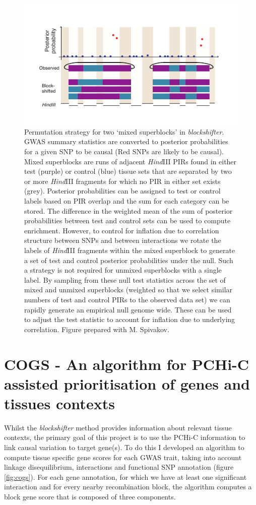 \documentclass[a4paper,11pt]{report}
\begin{document}
\begin{figure}[h]

\includegraphics[width=\textwidth]{blockshifter.pdf}
\caption{Permutation strategy for two `mixed superblocks' in \textit{blockshifter}. GWAS
summary statistics are converted to posterior probabilities for a given
SNP to be causal (Red SNPs are likely to be causal). Mixed superblocks
are runs of adjacent \textit{Hind}III PIRs  found in either test (purple) or
control (blue) tissue sets that are separated by two or more \textit{Hind}III
fragments for which no PIR in either set exists (grey). Posterior
probabilities can be assigned to test or control labels based on PIR
overlap and the sum for each category can be stored. The difference in
the weighted mean of the sum of posterior probabilities between test and
control sets can be used to compute enrichment.  However, to control for
inflation due to correlation structure between SNPs and between
interactions we rotate the labels of \textit{Hind}III fragments within the mixed
superblock to generate a set of test and control posterior probabilities
under the null. Such a strategy is not required for unmixed superblocks
with a single label.  By sampling from these null test statistics across
the set of mixed and unmixed superblocks (weighted so that we select
similar numbers of test and control PIRs to the observed data set)  we
can rapidly generate an empirical null genome wide. These can be used to
adjust the test statistic to account for inflation due to underlying
correlation. Figure prepared with M. Spivakov. }
\label{fig:blockshifter}
\centering
\end{figure}

\section{COGS - An algorithm for PCHi-C assisted prioritisation of genes and tissues contexts}
\label{sect:COGS}
Whilst the \textit{blockshifter} method provides information about relevant tissue contexts, the primary goal of this project is to use the PCHi-C information to link causal variation to target gene(s). To do this
I developed an algorithm to compute tissue specific gene scores for each GWAS trait, taking into account linkage disequilibrium, interactions and functional SNP annotation (figure \ref{fig:cogs}). For each gene annotation, for which we have at least one significant interaction and for every nearby recombination block, the algorithm computes a block gene score that is composed of three components.
\end{document}
